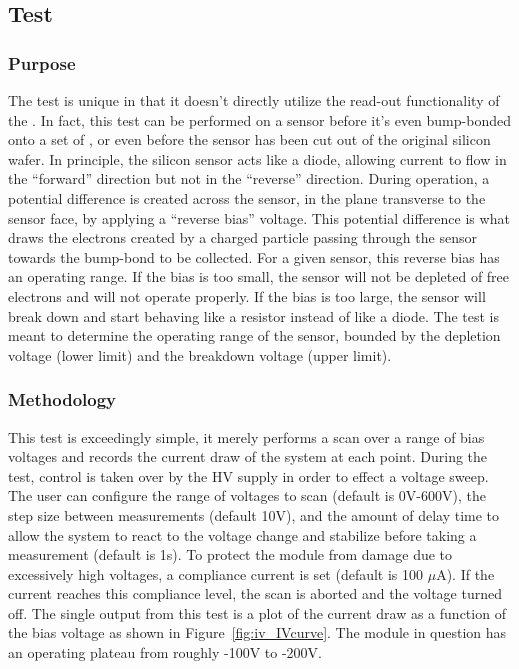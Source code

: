
\newpage

\subsection{\iv Test}
\label{ss:iv}

\subsubsection{Purpose}

The \iv test is unique in that it doesn't directly utilize the read-out functionality of the \roc.
In fact, this test can be performed on a sensor before it's even bump-bonded onto a set of \rocs, 
or even before the sensor has been cut out of the original silicon wafer.
In principle, the silicon sensor acts like a diode, 
allowing current to flow in the ``forward'' direction but not in the ``reverse'' direction.
During operation, a potential difference is created across the sensor, in the plane transverse to the sensor face,
by applying a ``reverse bias'' voltage.
This potential difference is what draws the electrons created by a charged particle passing through the sensor 
towards the bump-bond to be collected.
For a given sensor, this reverse bias has an operating range.
If the bias is too small, the sensor will not be depleted of free electrons and will not operate properly.
If the bias is too large, the sensor will break down and start behaving like a resistor instead of like a diode.
The \iv test is meant to determine the operating range of the sensor, 
bounded by the depletion voltage (lower limit) and the breakdown voltage (upper limit).

\subsubsection{Methodology}

This test is exceedingly simple, it merely performs a scan over a range of bias voltages
and records the current draw of the system at each point.
During the test, control is taken over by the HV supply in order to effect a voltage sweep.
The user can configure the range of voltages to scan (default is 0V-600V),
the step size between measurements (default 10V), 
and the amount of delay time to allow the system to react to the voltage change and stabilize before taking a measurement (default is 1s).
To protect the module from damage due to excessively high voltages, a compliance current is set (default is 100 $\mu$A).
If the current reaches this compliance level, the scan is aborted and the voltage turned off.
The single output from this test is a plot of the current draw as a function of the bias voltage
as shown in Figure~\ref{fig:iv_IVcurve}.
The module in question has an operating plateau from roughly -100V to -200V.

